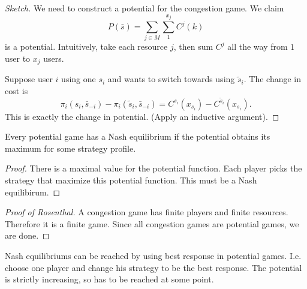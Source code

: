 \begin{proof}[Sketch]
    We need to construct a potential for the congestion game. We claim \[
    P(\bar{s})= \sum_{j\in M}\sum_{1}^{x_j}C^j(k) 
    \]is a potential.
    Intuitively, take each resource $j$, then sum $C^j$ all the way from $1$ user to $x_j$ users.

    Suppose user $i$ using one $s_i$ and wants to switch towards using $\tilde{s}_i$. The change in cost is \[
        \pi_i(s_i,\bar{s}_{-i})-\pi_i(\tilde{s}_i,\bar{s}_{-i})=C^{s_i}(x_{s_i})-C^{\tilde{s}_i}(x_{s_i}).
    \]
    This is exactly the change in potential. (Apply an inductive argument).
\end{proof}
\begin{atheorem}{}{}
    Every potential game has a Nash equilibrium if the potential obtains its maximum for some strategy profile.
\end{atheorem}
\begin{proof}
    There is a maximal value for the potential function. Each player picks the strategy that maximize this potential function. This must be a Nash equilibirum.
\end{proof}

\begin{proof}[Proof of Rosenthal]
    A congestion game has finite players and finite resources. Therefore it is a finite game. Since all congestion games are potential games, we are done.
\end{proof}


Nash equilibriums can be reached by using best response in potential games. I.e. choose one player and change his strategy to be the best response. The potential is strictly increasing, so has to be reached at some point. 